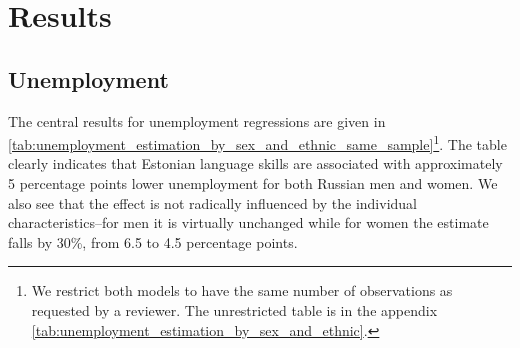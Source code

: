 \documentclass[12pt, a4paper]{article}
\begin{document}
\section{Results}
\label{sec:results}
\subsection{Unemployment}
\label{subsec:basic_model_unemployment}

The central results for unemployment regressions are given in
\cref{tab:unemployment_estimation_by_sex_and_ethnic_same_sample}\footnote{We
  restrict both models to have the same number of observations as
  requested by a reviewer. The unrestricted table is in the appendix \cref{tab:unemployment_estimation_by_sex_and_ethnic}.}.
The
table clearly indicates that Estonian language skills are associated
with approximately 5 percentage points lower unemployment for both
Russian men and women. We also see that the effect is not radically
influenced by the individual characteristics--for men it is
virtually unchanged while for women the estimate falls by 30\%, from
6.5 to 4.5 percentage points.
\end{document}
